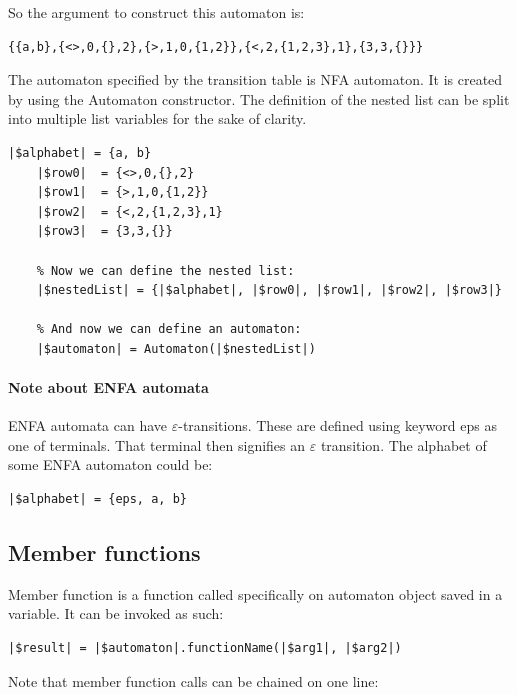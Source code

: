 \documentclass{ctuthesis}
\begin{document}
So the argument to construct this automaton is:
\begin{lstlisting}[language = JASL_snippet]
	{{a,b},{<>,0,{},2},{>,1,0,{1,2}},{<,2,{1,2,3},1},{3,3,{}}}
\end{lstlisting}

The automaton specified by the transition table is NFA automaton. It is created by using the Automaton constructor. The definition of the nested list can be split into multiple list variables for the sake of clarity. 

\begin{minipage}{\linewidth}
\begin{lstlisting}[language = JASL]
	|$alphabet| = {a, b}
	|$row0|  = {<>,0,{},2}
	|$row1|  = {>,1,0,{1,2}}
	|$row2|  = {<,2,{1,2,3},1}
	|$row3|  = {3,3,{}}
	
	% Now we can define the nested list:
	|$nestedList| = {|$alphabet|, |$row0|, |$row1|, |$row2|, |$row3|}
    
	% And now we can define an automaton:
	|$automaton| = Automaton(|$nestedList|)
\end{lstlisting}
\end{minipage}

\paragraph{Note about ENFA automata}
ENFA automata can have $\varepsilon$-transitions. These are defined using keyword eps as one of terminals. That terminal then signifies an $\varepsilon$ transition. The alphabet of some ENFA automaton could be:
\begin{lstlisting}[language = JASL]
	|$alphabet| = {eps, a, b}
\end{lstlisting} 

\subsection{Member functions}
Member function is a function called specifically on automaton object saved in a variable. It can be invoked as such:

\begin{minipage}{\linewidth}
\begin{lstlisting}[language = JASL_snippet]
	|$result| = |$automaton|.functionName(|$arg1|, |$arg2|)	
\end{lstlisting}
\end{minipage} 

Note that member function calls can be chained on one line:
\end{document}
